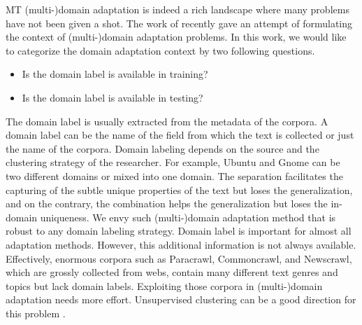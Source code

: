 MT (multi-)domain adaptation is indeed a rich landscape where many problems have not been given a shot. The work of \citet{Pham21revisiting} recently gave an attempt of formulating the context of (multi-)domain adaptation problems. In this work, we would like to categorize the domain adaptation context by two following questions.
\begin{itemize}
	\item Is the domain label is available in training?
	\item Is the domain label is available in testing?
\end{itemize}

The domain label is usually extracted from the metadata of the corpora. A domain label can be the name of the field from which the text is collected or just the name of the corpora. Domain labeling depends on the source and the clustering strategy of the researcher. For example, Ubuntu and Gnome can be two different domains or mixed into one domain. The separation facilitates the capturing of the subtle unique properties of the text but loses the generalization, and on the contrary, the combination helps the generalization but loses the in-domain uniqueness. We envy such (multi-)domain adaptation method that is robust to any domain labeling strategy. Domain label is important for almost all adaptation methods. However, this additional information is not always available. Effectively, enormous corpora such as Paracrawl, Commoncrawl, and Newscrawl, which are grossly collected from webs, contain many different text genres and topics but lack domain labels. Exploiting those corpora in (multi-)domain adaptation needs more effort. Unsupervised clustering can be a good direction for this problem \citep{Aharoni20unsupervised,Pham21revisiting}.




































